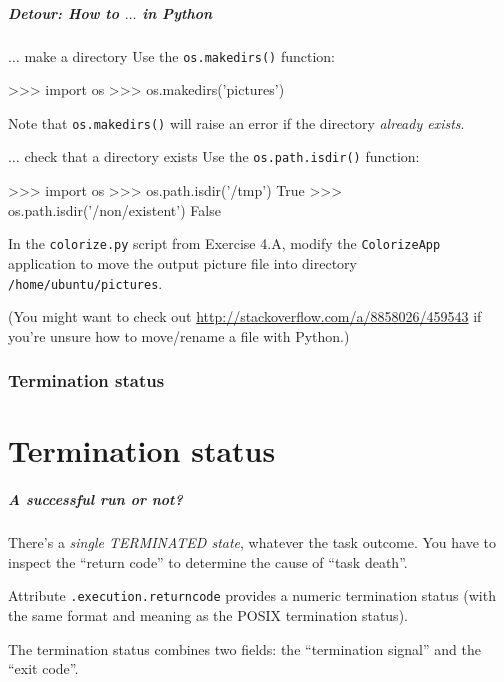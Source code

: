 \documentclass[english,serif,mathserif,xcolor=pdftex,dvipsnames,table]{beamer}
\begin{document}
\begin{frame}[fragile]
  \frametitle{Detour: How to $\ldots$ in Python}
  \small{}

  \begin{describe}{$\ldots$ make a directory}
    Use the \lstinline|os.makedirs()| function:
    \begin{python}
>>> import os
>>> os.makedirs('pictures')
   \end{python}
   Note that \lstinline|os.makedirs()| will raise an error if the directory
   \emph{already exists}.
  \end{describe}

  \begin{describe}{$\ldots$ check that a directory exists}
    Use the \lstinline|os.path.isdir()| function:
    \begin{python}
>>> import os
>>> os.path.isdir('/tmp')
True
>>> os.path.isdir('/non/existent')
False
    \end{python}
  \end{describe}
\end{frame}


\begin{frame}
  \begin{exercise*}[6.A]

    In the \texttt{colorize.py} script from Exercise 4.A, modify the
    \texttt{ColorizeApp} application to move the output picture file
    into directory \texttt{/home/ubuntu/pictures}.

    \+ {\small (You might want to check out
      \url{http://stackoverflow.com/a/8858026/459543} if you're unsure
      how to move/rename a file with Python.)}
  \end{exercise*}
\end{frame}


\section{Termination status}
\part{Termination status}

\begin{frame}[fragile]
  \frametitle{A successful run or not?}

  There's a \emph{single TERMINATED state}, whatever the task outcome.
  You have to inspect the ``return code'' to determine the
  cause of ``task death''.

  \+
  Attribute \lstinline|.execution.returncode| provides a numeric termination
  status (with the same format and meaning as the POSIX termination
  status).

  \+
  The termination status combines two fields: the ``termination
  signal'' and the ``exit code''.

\end{frame}
\end{document}
